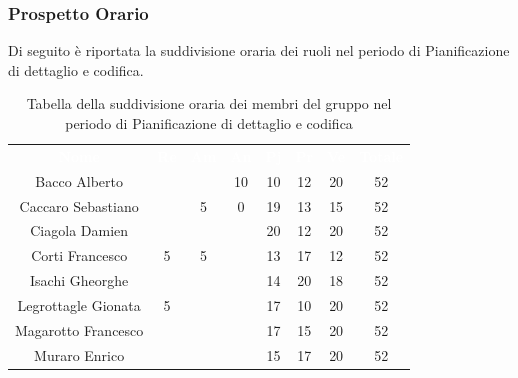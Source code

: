 \subsubsection{Prospetto Orario}
Di seguito è riportata la suddivisione oraria dei ruoli nel periodo di Pianificazione di dettaglio e codifica.




\begin{table}[H]	
	\begin{center}
	    \begin{tabular}{cccccccc}
			\rowcolor{greySWEight}
			\textcolor{white}{\textbf{Nome}} & \textcolor{white}{\textbf{Re}} & \textcolor{white}{\textbf{Am}} & \textcolor{white}{\textbf{An}} & \textcolor{white}{\textbf{Pj}} & \textcolor{white}{\textbf{Pr}} & \textcolor{white}{\textbf{Ve}} & \textcolor{white}{\textbf{Totale}}
			\\ 
			Bacco Alberto & & & 10 & 10 & 12 & 20 & 52 \\
			Caccaro Sebastiano & & 5 & 0 & 19 & 13 & 15 & 52 \\
			Ciagola Damien & & & & 20 & 12 & 20 & 52 \\
			Corti Francesco & 5 & 5 & & 13 & 17 & 12 & 52 \\
			Isachi Gheorghe & & & & 14 & 20 & 18 & 52 \\
			Legrottagle Gionata & 5 & & & 17 & 10 & 20 & 52 \\
			Magarotto Francesco & & & & 17 & 15 & 20 & 52 \\
			Muraro Enrico & & & & 15 & 17 & 20 & 52 \\
			\end{tabular}
	    \caption{Tabella della suddivisione oraria dei membri del gruppo nel periodo di Pianificazione di dettaglio e codifica} \label{tab:tabellaPersonePianificazione di dettaglio e codifica} 
	\end{center}
\end{table}


